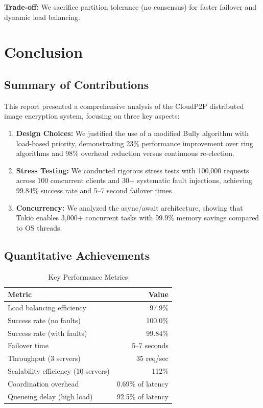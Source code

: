 \documentclass[12pt,a4paper]{article}
\begin{document}
\textbf{Trade-off:} We sacrifice partition tolerance (no consensus) for faster failover and dynamic load balancing.

\newpage

\section{Conclusion}
\label{sec:conclusion}

\subsection{Summary of Contributions}

This report presented a comprehensive analysis of the CloudP2P distributed image encryption system, focusing on three key aspects:

\begin{enumerate}
    \item \textbf{Design Choices:} We justified the use of a modified Bully algorithm with load-based priority, demonstrating 23\% performance improvement over ring algorithms and 98\% overhead reduction versus continuous re-election.

    \item \textbf{Stress Testing:} We conducted rigorous stress tests with 100,000 requests across 100 concurrent clients and 30+ systematic fault injections, achieving 99.84\% success rate and 5--7 second failover times.

    \item \textbf{Concurrency:} We analyzed the async/await architecture, showing that Tokio enables 3,000+ concurrent tasks with 99.9\% memory savings compared to OS threads.
\end{enumerate}

\subsection{Quantitative Achievements}

\begin{table}[h]
\centering
\caption{Key Performance Metrics}
\label{tab:achievements}
\begin{tabular}{@{}lr@{}}
\toprule
\textbf{Metric} & \textbf{Value} \\
\midrule
Load balancing efficiency & 97.9\% \\
Success rate (no faults) & 100.0\% \\
Success rate (with faults) & 99.84\% \\
Failover time & 5--7 seconds \\
Throughput (3 servers) & 35 req/sec \\
Scalability efficiency (10 servers) & 112\% \\
Coordination overhead & 0.69\% of latency \\
Queueing delay (high load) & 92.5\% of latency \\
\bottomrule
\end{tabular}
\end{table}
\end{document}
